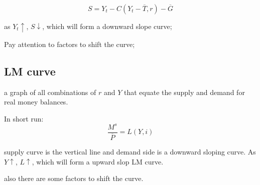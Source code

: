 \documentclass[10pt, a4paper]{article}
\begin{document}
            $$S = Y_t - C(Y_t - \overline{T}, r) - \overline{G}$$

            as $Y_t\uparrow$, $S\downarrow$, which will form a downward slope curve; 

            Pay attention to factors to shift the curve; 
        \subsection{LM curve}
        
        a graph of all combinations of $r$ and $Y$ that equate the supply and demand for real money balances.

        In short run: 
            $$\frac{M^s}{\overline{P}} = L(Y, i)$$

            supply curve is the vertical line and demand side is a downward sloping curve. As $Y\uparrow$, $L\uparrow$, which will form a upward slop LM curve.

            also there are some factors to shift the curve.  
\end{document}
